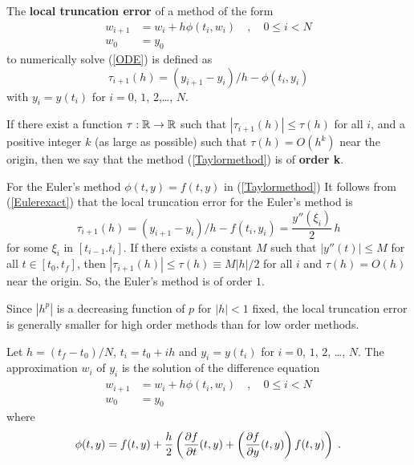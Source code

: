 \begin{defn}
The
{\bfseries local truncation error} of a method of the form 
\begin{equation} \label{Taylormethod}
\begin{split}
w_{i+1} & = w_i + h \phi(t_i,w_i) \quad, \quad 0 \leq i < N \\
w_0 & = y_0
\end{split}
\end{equation}
to numerically solve (\ref{ODE}) is defined as
\begin{equation} \label{truncerror}
\tau_{i+1}(h) = (y_{i+1} - y_i)/h - \phi(t_i,y_i)
\end{equation}
with $y_i = y(t_i)$ for $i=0$, $1$, $2$,\ldots, $N$.

If there exist a function $\tau:\mathbb{R}\to\mathbb{R}$ such that
$|\tau_{i+1}(h) | \leq \tau(h)$ for all $i$, and a positive
integer $k$ (as large as possible) such that $\tau(h) = O(h^k)$ near
the origin, then we say that the method (\ref{Taylormethod}) is of
{\bfseries order k}.
\label{localTruncErrorDef}
\end{defn}

\begin{egg}
For the Euler's method $\phi(t,y) = f(t,y)$ in (\ref{Taylormethod})
It follows from (\ref{Eulerexact}) that the local truncation error for
the Euler's method is
\[
\tau_{i+1}(h) = (y_{i+1} - y_i)/h - f(t_i,y_i) =
\frac{y''(\xi_i)}{2}\,h
\]
for some $\xi_i$ in $[t_{i-1}.t_i]$.  If there exists a constant $M$
such that $|y''(t)| \leq M$ for all $t\in [t_0,t_f]$, then
$|\tau_{i+1}(h)| \leq \tau(h) \equiv M|h|/2$ for all $i$ and
$\tau(h) = O(h)$ near the origin.  So, the Euler's method is of order $1$.
\end{egg}

\begin{rmk} Since $|h^p|$ is a decreasing function of $p$ for $|h|<1$
fixed, the local truncation error is generally smaller for high order
methods than for low order methods.
\end{rmk}

\begin{defn}
Let $h=(t_f-t_0)/N$, $t_i=t_0+ih$ and $y_i = y(t_i)$ for $i=0$,
$1$, $2$, \ldots, $N$.  The approximation $w_i$ of $y_i$ is the
solution of the difference equation
\[
\begin{split}
w_{i+1} & = w_i + h\phi(t_i, w_i) \quad, \quad 0 \leq i < N \\
w_0 & = y_0
\end{split}
\]
where
\[
\phi(t,y) = f(t,y) + \frac{h}{2} \left(\frac{\partial{f}}{\partial{t}}(t,y) +
\left( \frac{\partial{f}}{\partial{y}}(t,y) \right)f(t,y) \right)
\; .
\]
\label{Tayloralgo}
\end{defn}

